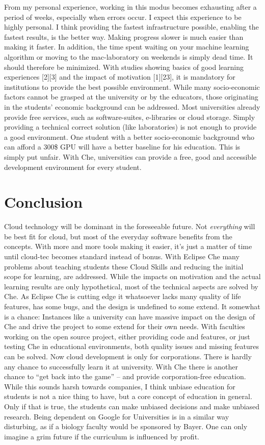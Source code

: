\documentclass[utf8,biblatex]{lni}
\begin{document}
From my personal experience, working in this modus becomes exhausting after a period of weeks, especially when errors occur. 
I expect this experience to be highly personal. 
I think providing the fastest infrastructure possible, enabling the fastest results, is the better way. 
Making progress slower is much easier than making it faster.  
In addition, the time spent waiting on your machine learning algorithm or moving to the mac-laboratory on weekends is simply dead time. 
It should therefore be minimized.   
With studies showing basics of good learning experiences [2][3] and the impact of motivation [1][23], it is mandatory for institutions to provide the best possible environment. 
While many socio-economic factors cannot be grasped at the university or by the educators, those originating in the students' economic background can be addressed.
Most universities already provide free services, such as software-suites, e-libraries or cloud storage.
Simply providing a technical correct solution (like laboratories) is not enough to provide a good environment.
One student with a better socio-economic background who can afford a 300\$ GPU will have a better baseline for his education. 
This is simply put unfair.
With Che, universities can provide a free, good and accessible development environment for every student.
\section{Conclusion}
Cloud technology will be dominant in the foreseeable future. 
Not \textit{everything} will be best fit for cloud, but most of the everyday software benefits from the concepts. 
With more and more tools making it easier, it's just a matter of time until cloud-tec becomes standard instead of bonus.
With Eclipse Che many problems about teaching students these Cloud Skills and reducing the initial scope for learning, are addressed. 
While the impacts on motivation and the actual learning results are only hypothetical, most of the technical aspects are solved by Che.  
As Eclipse Che is cutting edge it whatsoever lacks many quality of life features, has some bugs, and the design is undefined to some extend. 
It somewhat is a chance: 
Instances like a university can have massive impact on the design of Che and drive the project to some extend for their own needs. 
With faculties working on the open source project, either providing code and features, or just testing Che in educational environments, both quality issues and missing features can be solved.    
Now cloud development is only for corporations. 
There is hardly any chance to successfully learn it at university. 
With Che there is another chance to “get back into the game” – and provide corporation-free education.  
While this sounds harsh towards companies, I think unbiase education for students is not a nice thing to have, but a core concept of education in general. 
Only if that is true, the students can make unbiased decisions and make unbiased research. 
Being dependent on Google for Universities is in a similar way disturbing, as if a biology faculty would be sponsored by Bayer. 
One can only imagine a grim future if the curriculum is influenced by profit. 
\end{document}
